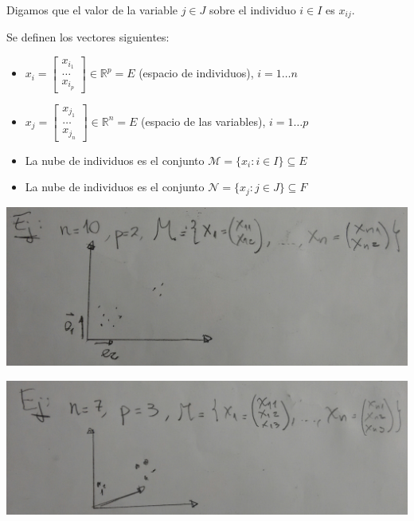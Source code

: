 \documentclass[10pt]{article}
\theoremstyle{plain}
\theoremstyle{definition}
\begin{document}
Digamos que el valor de la variable $j\in J$ sobre el individuo $i\in I$ es $x_{ij}$.

Se definen los vectores siguientes:
\begin{itemize}
\item $x_{i} = \begin{bmatrix}
x_{i_{1}} \\ \ldots \\ x_{i_{p}}
\end{bmatrix}\in \mathbb{R}^p = E$ (espacio de individuos), $i = 1 \ldots n$
\item $x_{j} = \begin{bmatrix}
x_{j_{1}} \\ \ldots \\ x_{j_{n}}
\end{bmatrix}\in \mathbb{R}^n = E$ (espacio de las variables), $i = 1 \ldots p$
\item La nube de individuos es el conjunto $\mathcal{M} = \{x_{i}\colon i \in I\} \subseteq E$
\item La nube de individuos es el conjunto $\mathcal{N} = \{x_{j}\colon j \in J\} \subseteq F$
\end{itemize}
\begin{center}
\includegraphics[scale=0.1]{imagenes/ejemplo1.jpg}
\end{center}
\begin{center}
\includegraphics[scale=0.1]{imagenes/ejemplo2.jpg}
\end{center}
\end{document}
